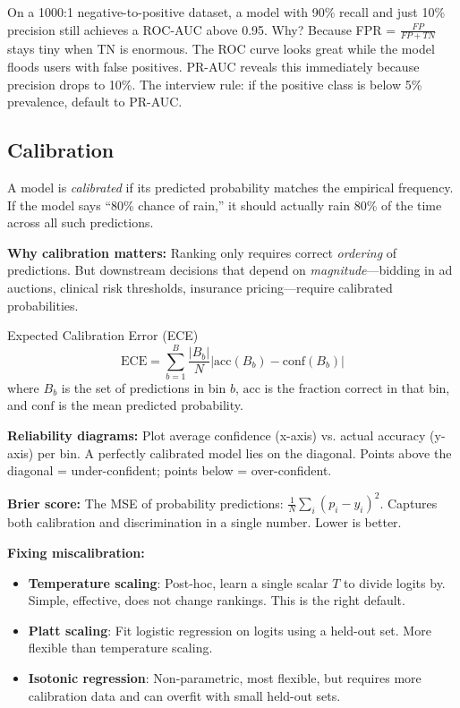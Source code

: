 \begin{keyinsight}
On a 1000:1 negative-to-positive dataset, a model with 90\% recall and just 10\% precision still achieves a ROC-AUC above 0.95. Why? Because FPR = $\frac{FP}{FP+TN}$ stays tiny when TN is enormous. The ROC curve looks great while the model floods users with false positives. PR-AUC reveals this immediately because precision drops to 10\%. The interview rule: if the positive class is below 5\% prevalence, default to PR-AUC.
\end{keyinsight}

\subsection{Calibration}

A model is \textit{calibrated} if its predicted probability matches the empirical frequency. If the model says ``80\% chance of rain,'' it should actually rain 80\% of the time across all such predictions.

\textbf{Why calibration matters:} Ranking only requires correct \textit{ordering} of predictions. But downstream decisions that depend on \textit{magnitude}---bidding in ad auctions, clinical risk thresholds, insurance pricing---require calibrated probabilities.

\begin{mathresult}{Expected Calibration Error (ECE)}
\[
\text{ECE} = \sum_{b=1}^{B} \frac{|B_b|}{N} \left| \text{acc}(B_b) - \text{conf}(B_b) \right|
\]
where $B_b$ is the set of predictions in bin $b$, $\text{acc}$ is the fraction correct in that bin, and $\text{conf}$ is the mean predicted probability.
\end{mathresult}

\textbf{Reliability diagrams:} Plot average confidence (x-axis) vs. actual accuracy (y-axis) per bin. A perfectly calibrated model lies on the diagonal. Points above the diagonal = under-confident; points below = over-confident.

\textbf{Brier score:} The MSE of probability predictions: $\frac{1}{N}\sum_i (p_i - y_i)^2$. Captures both calibration and discrimination in a single number. Lower is better.

\textbf{Fixing miscalibration:}
\begin{itemize}
    \item \textbf{Temperature scaling}: Post-hoc, learn a single scalar $T$ to divide logits by. Simple, effective, does not change rankings. This is the right default.
    \item \textbf{Platt scaling}: Fit logistic regression on logits using a held-out set. More flexible than temperature scaling.
    \item \textbf{Isotonic regression}: Non-parametric, most flexible, but requires more calibration data and can overfit with small held-out sets.
\end{itemize}

